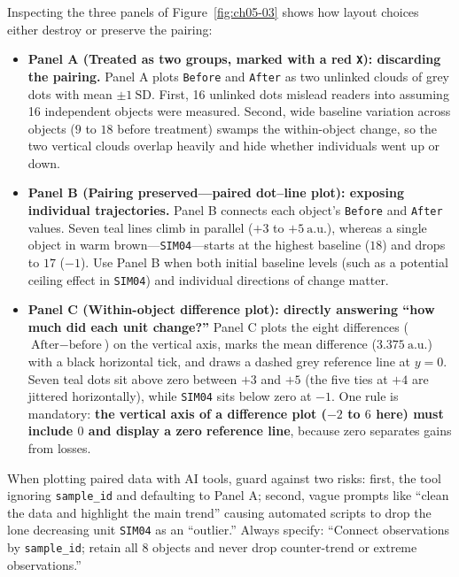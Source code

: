 Inspecting the three panels of Figure~\ref{fig:ch05-03} shows how layout choices either destroy or preserve the pairing:

\begin{itemize}
\item \textbf{Panel A (Treated as two groups, marked with a red \texttt{X}): discarding the pairing.} Panel A plots \texttt{Before} and \texttt{After} as two unlinked clouds of grey dots with mean $\pm 1\ \text{SD}$. First, 16 unlinked dots mislead readers into assuming 16 independent objects were measured. Second, wide baseline variation across objects ($9$ to $18$ before treatment) swamps the within-object change, so the two vertical clouds overlap heavily and hide whether individuals went up or down.

\item \textbf{Panel B (Pairing preserved—paired dot--line plot): exposing individual trajectories.} Panel B connects each object's \texttt{Before} and \texttt{After} values. Seven teal lines climb in parallel ($+3$ to $+5\ \text{a.u.}$), whereas a single object in warm brown—\texttt{SIM04}—starts at the highest baseline ($18$) and drops to $17$ ($-1$). Use Panel B when both initial baseline levels (such as a potential ceiling effect in \texttt{SIM04}) and individual directions of change matter.

\item \textbf{Panel C (Within-object difference plot): directly answering ``how much did each unit change?''} Panel C plots the eight differences ($\text{After} - \text{before}$) on the vertical axis, marks the mean difference ($3.375\ \text{a.u.}$) with a black horizontal tick, and draws a dashed grey reference line at $y = 0$. Seven teal dots sit above zero between $+3$ and $+5$ (the five ties at $+4$ are jittered horizontally), while \texttt{SIM04} sits below zero at $-1$. One rule is mandatory: \textbf{the vertical axis of a difference plot ($-2$ to $6$ here) must include $0$ and display a zero reference line}, because zero separates gains from losses.
\end{itemize}

When plotting paired data with AI tools, guard against two risks: first, the tool ignoring \texttt{sample\_id} and defaulting to Panel A; second, vague prompts like ``clean the data and highlight the main trend'' causing automated scripts to drop the lone decreasing unit \texttt{SIM04} as an ``outlier.'' Always specify: ``Connect observations by \texttt{sample\_id}; retain all 8 objects and never drop counter-trend or extreme observations.''

